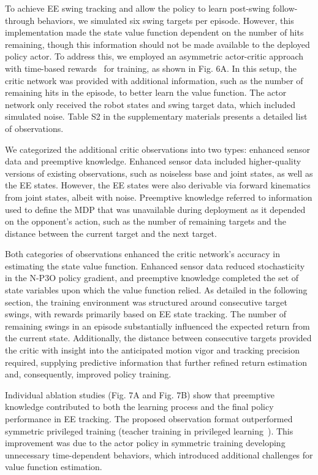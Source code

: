 \documentclass[9pt,twocolumn,twoside]{osajnl}
\begin{document}



To achieve \ac{EE} swing tracking and allow the policy to learn post-swing follow-through behaviors, we simulated six swing targets per episode. However, this implementation made the state value function dependent on the number of hits remaining, though this information should not be made available to the deployed policy actor. To address this, we employed an asymmetric actor-critic approach~\cite{pinto2017asymmetricactorcriticimagebased} with time-based rewards~\cite{rudin2022advanced} for training, as shown in Fig. 6A. In this setup, the critic network was provided with additional information, such as the number of remaining hits in the episode, to better learn the value function. The actor network only received the robot states and swing target data, which included simulated noise. Table S2 in the supplementary materials presents a detailed list of observations.

We categorized the additional critic observations into two types: enhanced sensor data and preemptive knowledge. Enhanced sensor data included higher-quality versions of existing observations, such as noiseless base and joint states, as well as the \ac{EE} states. However, the \ac{EE} states were also derivable via forward kinematics from joint states, albeit with noise. Preemptive knowledge referred to information used to define the MDP that was unavailable during deployment as it depended on the opponent's action, such as the number of remaining targets and the distance between the current target and the next target.

Both categories of observations enhanced the critic network's accuracy in estimating the state value function. Enhanced sensor data reduced stochasticity in the \ac{N-P3O} policy gradient, and preemptive knowledge completed the set of state variables upon which the value function relied. As detailed in the following section, the training environment was structured around consecutive target swings, with rewards primarily based on \ac{EE} state tracking. The number of remaining swings in an episode substantially influenced the expected return from the current state. Additionally, the distance between consecutive targets provided the critic with insight into the anticipated motion vigor and tracking precision required, supplying predictive information that further refined return estimation and, consequently, improved policy training.

Individual ablation studies (Fig. 7A and Fig. 7B) show that preemptive knowledge contributed to both the learning process and the final policy performance in \ac{EE} tracking. The proposed observation format outperformed symmetric privileged training (teacher training in privileged learning~\cite{lee2020learning}). This improvement was due to the actor policy in symmetric training developing unnecessary time-dependent behaviors, which introduced additional challenges for value function estimation.
\end{document}
